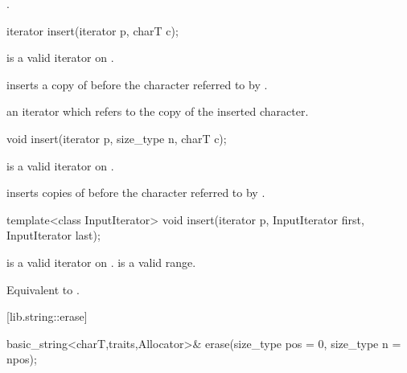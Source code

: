 \begin{itemdescr}
\pnum
\returns
{}.
\end{itemdescr}

%
%
\begin{itemdecl}
iterator insert(iterator p, charT c);
\end{itemdecl}

\begin{itemdescr}
\pnum
\requires
{} is a valid iterator on
.

\pnum
\effects
inserts a copy of  before the character referred to by .

\pnum
\returns
an iterator which refers to the copy of the inserted character.
\end{itemdescr}

%
%
\begin{itemdecl}
void insert(iterator p, size_type n, charT c);
\end{itemdecl}

\begin{itemdescr}
\pnum
\requires
{} is a valid iterator on
.

\pnum
\effects
inserts  copies of  before the character referred to by .
\end{itemdescr}

%
%
\begin{itemdecl}
template<class InputIterator>
  void insert(iterator p, InputIterator first, InputIterator last);
\end{itemdecl}

\begin{itemdescr}
\pnum
\requires
{} is a valid iterator on
.
\tcode{[first,last)}
is a valid range.

\pnum
\effects
Equivalent to
.
\end{itemdescr}

[lib.string::erase]{}

%
%
\begin{itemdecl}
basic_string<charT,traits,Allocator>&
  erase(size_type pos = 0, size_type n = npos);
\end{itemdecl}

